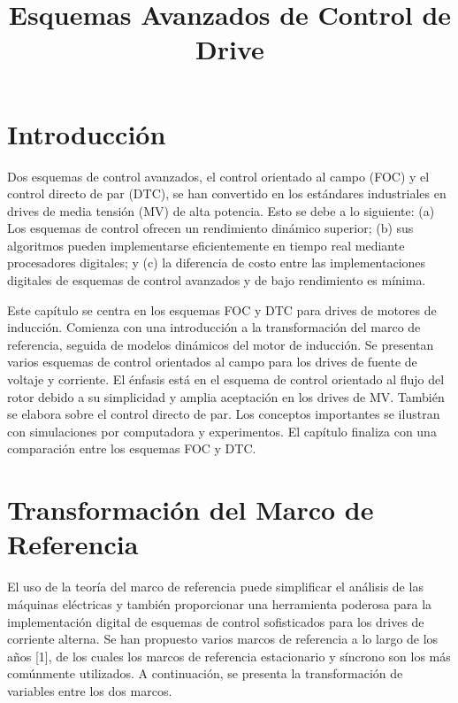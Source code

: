 \documentclass[letterpaper,12pt]{article}
\title{Esquemas Avanzados de Control de Drive}
\author{}
\date{}
\begin{document}
\maketitle
\thispagestyle{fancy} %

\section{Introducción}

Dos esquemas de control avanzados, el control orientado al campo (FOC) y el control directo de par (DTC), se han convertido en los estándares industriales en drives de media tensión (MV) de alta potencia. Esto se debe a lo siguiente: (a) Los esquemas de control ofrecen un rendimiento dinámico superior; (b) sus algoritmos pueden implementarse eficientemente en tiempo real mediante procesadores digitales; y (c) la diferencia de costo entre las implementaciones digitales de esquemas de control avanzados y de bajo rendimiento es mínima.

Este capítulo se centra en los esquemas FOC y DTC para drives de motores de inducción. Comienza con una introducción a la transformación del marco de referencia, seguida de modelos dinámicos del motor de inducción. Se presentan varios esquemas de control orientados al campo para los drives de fuente de voltaje y corriente. El énfasis está en el esquema de control orientado al flujo del rotor debido a su simplicidad y amplia aceptación en los drives de MV. También se elabora sobre el control directo de par. Los conceptos importantes se ilustran con simulaciones por computadora y experimentos. El capítulo finaliza con una comparación entre los esquemas FOC y DTC.

\section{Transformación del Marco de Referencia}

El uso de la teoría del marco de referencia puede simplificar el análisis de las máquinas eléctricas y también proporcionar una herramienta poderosa para la implementación digital de esquemas de control sofisticados para los drives de corriente alterna. Se han propuesto varios marcos de referencia a lo largo de los años [1], de los cuales los marcos de referencia estacionario y síncrono son los más comúnmente utilizados. A continuación, se presenta la transformación de variables entre los dos marcos.

\clearpage
\end{document}
